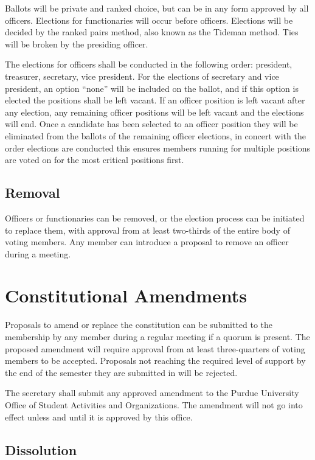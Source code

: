 \documentclass{article}
\begin{document}
Ballots will be private and ranked choice, but can be in any form approved by
all officers. Elections for functionaries will occur before officers. Elections
will be decided by the ranked pairs method, also known as the Tideman method.
Ties will be broken by the presiding officer.

The elections for officers shall be conducted in the following order: president,
treasurer, secretary, vice president. For the elections of secretary and vice
president, an option ``none'' will be included on the ballot, and if this option
is elected the positions shall be left vacant. If an officer position is left
vacant after any election, any remaining officer positions will be left vacant
and the elections will end. Once a candidate has been selected to an officer
position they will be eliminated from the ballots of the remaining officer
elections, in concert with the order elections are conducted this ensures
members running for multiple positions are voted on for the most critical
positions first.

\subsection{Removal}

Officers or functionaries can be removed, or the election process can be
initiated to replace them, with approval from at least two-thirds of the entire
body of voting members. Any member can introduce a proposal to remove an officer
during a meeting.

\section{Constitutional Amendments}

Proposals to amend or replace the constitution can be submitted to the
membership by any member during a regular meeting if a quorum is present. The
proposed amendment will require approval from at least three-quarters of voting
members to be accepted. Proposals not reaching the required level of support by
the end of the semester they are submitted in will be rejected.

The secretary shall submit any approved amendment to the Purdue University
Office of Student Activities and Organizations. The amendment will not go into
effect unless and until it is approved by this office.

\subsection{Dissolution}
\end{document}
